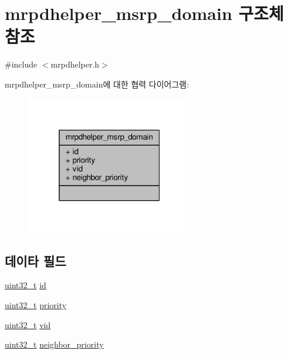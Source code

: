 \hypertarget{structmrpdhelper__msrp__domain}{}\section{mrpdhelper\+\_\+msrp\+\_\+domain 구조체 참조}
\label{structmrpdhelper__msrp__domain}


{\ttfamily \#include $<$mrpdhelper.\+h$>$}



mrpdhelper\+\_\+msrp\+\_\+domain에 대한 협력 다이어그램\+:
\nopagebreak
\begin{figure}[H]
\begin{center}
\leavevmode
\includegraphics[width=208pt]{structmrpdhelper__msrp__domain__coll__graph}
\end{center}
\end{figure}
\subsection*{데이타 필드}
\begin{DoxyCompactItemize}
\item 
\hyperlink{parse_8c_a6eb1e68cc391dd753bc8ce896dbb8315}{uint32\+\_\+t} \hyperlink{structmrpdhelper__msrp__domain_abaabdc509cdaba7df9f56c6c76f3ae19}{id}
\item 
\hyperlink{parse_8c_a6eb1e68cc391dd753bc8ce896dbb8315}{uint32\+\_\+t} \hyperlink{structmrpdhelper__msrp__domain_a90249de64da5ae5d7acd34da7ea1b857}{priority}
\item 
\hyperlink{parse_8c_a6eb1e68cc391dd753bc8ce896dbb8315}{uint32\+\_\+t} \hyperlink{structmrpdhelper__msrp__domain_a98780fe4ab562a61abfd7870ea0910c3}{vid}
\item 
\hyperlink{parse_8c_a6eb1e68cc391dd753bc8ce896dbb8315}{uint32\+\_\+t} \hyperlink{structmrpdhelper__msrp__domain_a5f123157905f61ce118a08f1d52589f5}{neighbor\+\_\+priority}
\end{DoxyCompactItemize}


